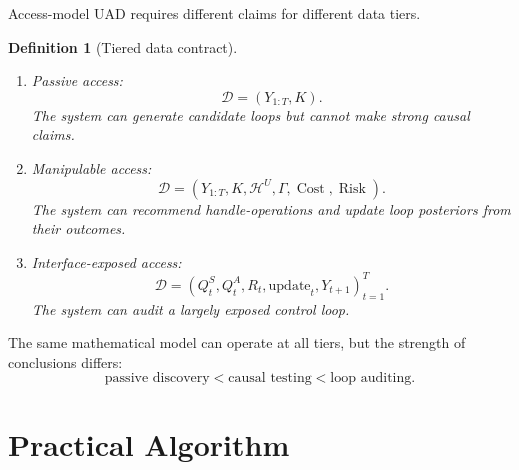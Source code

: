 \documentclass[11pt]{article}
\newtheorem{definition}{Definition}
\newcommand{\Hh}{\mathcal H}
\newcommand{\D}{\mathcal D}
\newcommand{\cost}{\operatorname{Cost}}
\newcommand{\risk}{\operatorname{Risk}}
\begin{document}
Access-model UAD requires different claims for different data tiers.

\begin{definition}[Tiered data contract]
\begin{enumerate}[label=\textbf{Tier \arabic*:},leftmargin=*]
    \item Passive access:
    \[
        \D=(Y_{1:T},K).
    \]
    The system can generate candidate loops but cannot make strong causal claims.

    \item Manipulable access:
    \[
        \D=(Y_{1:T},K,\Hh^U,\Gamma,\cost,\risk).
    \]
    The system can recommend handle-operations and update loop posteriors from
    their outcomes.

    \item Interface-exposed access:
    \[
        \D=(Q^S_t,Q^A_t,R_t,\text{update}_t,Y_{t+1})_{t=1}^T.
    \]
    The system can audit a largely exposed control loop.
\end{enumerate}
\end{definition}

The same mathematical model can operate at all tiers, but the strength of
conclusions differs:
\[
    \text{passive discovery}
    <
    \text{causal testing}
    <
    \text{loop auditing}.
\]

\section{Practical Algorithm}
\end{document}
